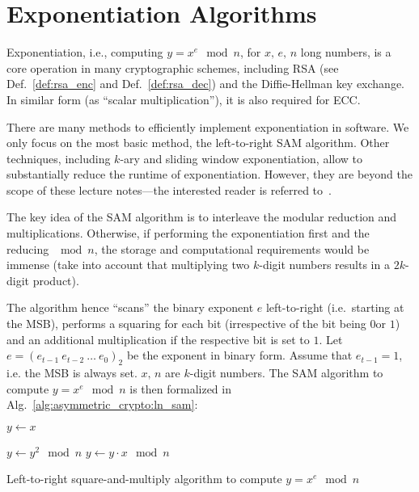 \section{Exponentiation Algorithms}
Exponentiation, i.e., computing $y = x^e \mod n$, for $x,\,e,\,n$ long numbers, is a core operation in many cryptographic schemes, including \ac{RSA} (see Def.~\ref{def:rsa_enc} and Def.~\ref{def:rsa_dec}) and the Diffie-Hellman key exchange. In similar form (as ``scalar multiplication''), it is also required for \ac{ECC}.

There are many methods to efficiently implement exponentiation in software. We only focus on the most basic method, the left-to-right \ac{SAM} algorithm. Other techniques, including $k$-ary and sliding window exponentiation, allow to substantially reduce the runtime of exponentiation. However, they are beyond the scope of these lecture notes---the interested reader is referred to~\cite[14.6]{menezes96handbook}.  

The key idea of the \ac{SAM} algorithm is to interleave the modular reduction and multiplications. Otherwise, if performing the exponentiation first and the reducing $\mod n$, the storage and computational requirements would be immense (take into account that multiplying two $k$-digit numbers results in a $2k$-digit product).

The algorithm hence ``scans'' the binary exponent $e$ left-to-right (i.e.~starting at the \ac{MSB}), performs a squaring for each bit (irrespective of the bit being $0$or $1$) and an additional multiplication if the respective bit is set to $1$. 
Let $e = \left(e_{t-1}\ e_{t-2}\ \ldots \ e_0\right)_2$ be the exponent in binary form. 
Assume that $e_{t-1} = 1$, i.e. the \ac{MSB} is always set. 
$x,\,n$ are $k$-digit numbers. The \ac{SAM} algorithm to compute $y = x^e \mod n$ is then formalized in Alg.~\ref{alg:asymmetric_crypto:ln_sam}:

\begin{algorithm}
\center
\begin{algorithmic}
\vspace{2mm}
\State $y \gets x$ 

	\State $y \gets y^2 \mod n$
	\State $y \gets y \cdot x \mod n$
	\EndIf
\EndFor

\vspace{2mm}
\end{algorithmic}
\caption{Left-to-right square-and-multiply algorithm to compute $y = x^e \mod n$}
\label{alg:asymmetric_crypto:ln_sam}
\end{algorithm}

